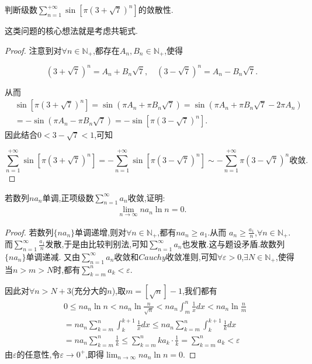 \documentclass[lang=cn,newtx,10pt,scheme=chinese]{../Template/elegantbook}
\begin{document}
\begin{example}
判断级数$\sum_{n=1}^{+\infty}{\sin \left[ \pi \left( 3+\sqrt{7} \right) ^n \right]}$的敛散性.
\end{example}
\begin{note}
这类问题的核心想法就是考虑共轭式.
\end{note}
\begin{proof}
注意到对\(\forall n \in \mathbb{N}_+\),都存在\(A_n,B_n \in \mathbb{N}_+\),使得

\[
(3 + \sqrt{7})^n = A_n + B_n\sqrt{7}, \quad (3 - \sqrt{7})^n = A_n - B_n\sqrt{7}.
\]

从而
\begin{align*}
&\sin[\pi(3 + \sqrt{7})^n] = \sin(\pi A_n + \pi B_n\sqrt{7})
= \sin(\pi A_n + \pi B_n\sqrt{7} - 2\pi A_n)\\
&= -\sin(\pi A_n - \pi B_n\sqrt{7})= -\sin[\pi(3 - \sqrt{7})^n].
\end{align*}
因此结合\(0 < 3 - \sqrt{7} < 1\),可知

\[
\sum_{n = 1}^{+\infty} \sin[\pi(3 + \sqrt{7})^n] = -\sum_{n = 1}^{+\infty} \sin[\pi(3 - \sqrt{7})^n] \sim -\sum_{n = 1}^{+\infty} \pi(3 - \sqrt{7})^n \text{收敛}.
\]
\end{proof}

\begin{example}
若数列${na_n}$单调,正项级数$\sum_{n=1}^{\infty}{a_n}$收敛,证明:
\begin{align*}
\lim_{n\rightarrow \infty} na_n\ln n=0.
\end{align*}
\end{example}
\begin{proof}
若数列\(\{ na_n\}\)单调递增,则对\(\forall n \in \mathbb{N}_+\),都有\(na_n \geqslant a_1\).从而
\(a_n \geqslant \frac{a_1}{n}\),\(\forall n \in \mathbb{N}_+\).
而\(\sum_{n = 1}^{\infty}\frac{a_1}{n}\)发散,于是由比较判别法,可知\(\sum_{n = 1}^{\infty}a_n\)也发散.这与题设矛盾.故数列\(\{ na_n\}\)单调递减.
又由\(\sum_{n = 1}^{\infty}a_n\)收敛和\(Cauchy\)收敛准则,可知\(\forall \varepsilon > 0\),\(\exists N \in \mathbb{N}_+\),使得当\(n > m > N\)时,都有\(\sum_{k = m}^{n}a_k < \varepsilon\).

因此对\(\forall n > N + 3\)(充分大的\(n\)),取\(m = [\sqrt{n}] - 1\),我们都有
\begin{align*}
&0 \leqslant na_n\ln n < na_n\ln\frac{n}{\sqrt{n}} < na_n\int_{m}^{n}\frac{1}{x}dx<na_n\ln \frac{n}{m} \\
&= na_n\sum_{k = m}^{n}\int_{k}^{k + 1}\frac{1}{x}dx \leqslant na_n\sum_{k = m}^{n}\int_{k}^{k + 1}\frac{1}{k}dx\\
&= na_n\sum_{k = m}^{n}\frac{1}{k} \leqslant \sum_{k = m}^{n}ka_k\cdot\frac{1}{k} = \sum_{k = m}^{n}a_k < \varepsilon
\end{align*}
由\(\varepsilon\)的任意性,令\(\varepsilon \to 0^+\),即得\(\lim_{n \to \infty}na_n\ln n = 0\). 
\end{proof}
\end{document}
